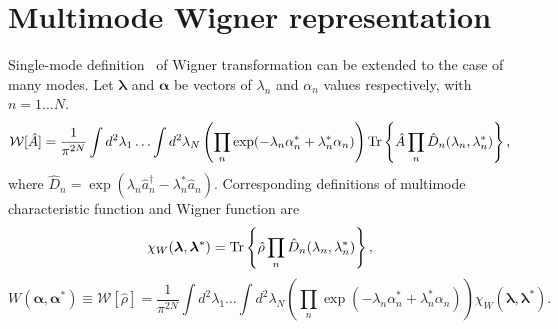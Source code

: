 \section{Multimode Wigner representation}


Single-mode definition~ of Wigner transformation can be extended to the case of many modes.
Let $\bm{\lambda}$ and $\bm{\alpha}$ be vectors of $\lambda_n$ and $\alpha_n$ values respectively,
with $n = 1 \ldots N$.
\begin{equation}
\label{eqn:formalism:mm-wigner:w-transformation}
	\mathcal{W}[\hat{A}]
	= \frac{1}{\pi^{2N}} \int d^2 \lambda_1 \ldots \int d^2 \lambda_N
		\left(
			\prod_n \exp(-\lambda_n \alpha_n^* + \lambda_n^* \alpha_n)
		\right)
		\mathrm{Tr} \left\{ 
			\hat{A}
			\prod_n \hat{D}_n (\lambda_n, \lambda_n^*)
		 \right\},
\end{equation}
where $\hat{D}_n = \exp(\lambda_n \hat{a}_n^\dagger - \lambda_n^* \hat{a}_n)$.
Corresponding definitions of multimode characteristic function and Wigner function are
\[
	\chi_W (\bm{\lambda}, \bm{\lambda}^*)
	= \mathrm{Tr} \left\{ 
		\hat{\rho}
		\prod_n \hat{D}_n (\lambda_n, \lambda_n^*)
	 \right\},
\]
\begin{equation}
\label{eqn:formalism:mm-wigner:w-definition}
	W (\bm{\alpha}, \bm{\alpha}^*)
	\equiv \mathcal{W}[\hat{\rho}]
	= \frac{1}{\pi^{2N}} \int d^2 \lambda_1 \ldots \int d^2 \lambda_N
		\left(
			\prod_n \exp(-\lambda_n \alpha_n^* + \lambda_n^* \alpha_n)
		\right)
		\chi_W (\bm{\lambda}, \bm{\lambda}^*).
\end{equation}

